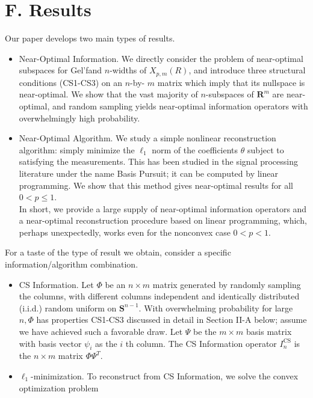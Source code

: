 \documentclass[10pt]{article}
\begin{document}
\section*{F. Results}
Our paper develops two main types of results.

\begin{itemize}
  \item Near-Optimal Information. We directly consider the problem of near-optimal subspaces for Gel'fand $n$-widths of $X_{p, m}(R)$, and introduce three structural conditions (CS1-CS3) on an $n$-by- $m$ matrix which imply that its nullspace is near-optimal. We show that the vast majority of $n$-subspaces of $\boldsymbol{R}^{m}$ are near-optimal, and random sampling yields near-optimal information operators with overwhelmingly high probability.
  \item Near-Optimal Algorithm. We study a simple nonlinear reconstruction algorithm: simply minimize the $\ell_{1}$ norm of the coefficients $\theta$ subject to satisfying the measurements. This has been studied in the signal processing literature under the name Basis Pursuit; it can be computed by linear programming. We show that this method gives near-optimal results for all $0<p \leq 1$.\\
In short, we provide a large supply of near-optimal information operators and a near-optimal reconstruction procedure based on linear programming, which, perhaps unexpectedly, works even for the nonconvex case $0<p<1$.
\end{itemize}

For a taste of the type of result we obtain, consider a specific information/algorithm combination.

\begin{itemize}
  \item CS Information. Let $\Phi$ be an $n \times m$ matrix generated by randomly sampling the columns, with different columns independent and identically distributed (i.i.d.) random uniform on $\boldsymbol{S}^{n-1}$. With overwhelming probability for large $n, \Phi$ has properties CS1-CS3 discussed in detail in Section II-A below; assume we have achieved such a favorable draw. Let $\Psi$ be the $m \times m$ basis matrix with basis vector $\psi_{i}$ as the $i$ th column. The CS Information operator $I_{n}^{\mathrm{CS}}$ is the $n \times m$ matrix $\Phi \Psi^{T}$.
  \item $\ell_{1}$-minimization. To reconstruct from CS Information, we solve the convex optimization problem
\end{itemize}
\end{document}
